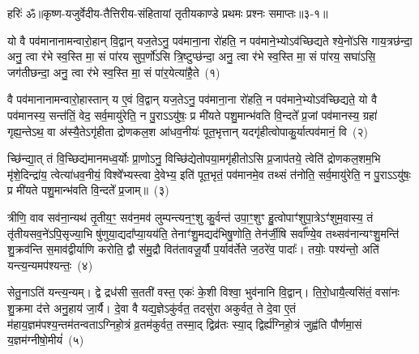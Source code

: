{\anuvakamend[{वी॒र इषꣳ॑ ह॒व्यमु॒षसो॑ मरुतश्च॒ वृष्टिं॒ भग॑स्य॒ द्वाद॑श च}]}%

{हरिः॑ ॐ}{॥कृष्ण-यजुर्वेदीय-तैत्तिरीय-संहितायां तृतीयकाण्डे प्रथमः प्रश्नः समाप्तः॥३-१॥}

\setcounter{anuvakam}{0}
यो वै पव॑मानानामन्वारो॒हान् वि॒द्वान् यज॒ते\-ऽनु॒ पव॑माना॒ना रो॑हति॒ न पव॑माने॒भ्यो\-ऽव॑च्छिद्यते श्ये॒नो॑\-ऽसि गाय॒त्रछ॑न्दा॒ अनु॒ त्वा र॑भे स्व॒स्ति मा॒ सं पा॑रय सुप॒र्णो॑\-ऽसि त्रि॒ष्टुप्छ॑न्दा॒ अनु॒ त्वा र॑भे स्व॒स्ति मा॒ सं पा॑रय॒ सघा॑ऽसि॒ जग॑तीछन्दा॒ अनु॒ त्वा र॑भे स्व॒स्ति मा॒ सं पा॑र॒येत्या॑है॒ते~(१)

वै पव॑मानानामन्वारो॒हास्तान् य ए॒वं वि॒द्वान् यज॒ते\-ऽनु॒ पव॑माना॒ना रो॑हति॒ न पव॑माने॒भ्यो\-ऽव॑च्छिद्यते॒ यो वै पव॑मानस्य॒ सन्त॑तिं॒ वेद॒ सर्व॒मायु॑रेति॒ न पु॒रा\-ऽऽ\-यु॑षः॒ प्र मी॑यते पशु॒मान्भ॑वति वि॒न्दते᳚ प्र॒जां पव॑मानस्य॒ ग्रहा॑ गृह्य॒न्ते\-ऽथ॒ वा अ॑स्यै॒ते\-ऽगृ॑हीता द्रोणकल॒श आ॑धव॒नीयः॑ पूत॒भृत्तान् यदगृ॑हीत्वोपाकु॒र्यात्पव॑मानं॒ वि~(२)

च्छि॑न्द्या॒त् तं वि॒च्छिद्य॑मानमध्व॒र्योः प्रा॒णो\-ऽनु॒ विच्छि॑द्येतोप\-या॒मगृ॑हीतो\-ऽसि प्र॒जा\-प॑तये॒ त्वेति॑ द्रोणकल॒शम॒भि मृ॑शे॒दिन्द्रा॑य॒ त्वेत्या॑धव॒नीयं॒ विश्वे᳚भ्यस्त्वा दे॒वेभ्य॒ इति॑ पूत॒भृतं॒ पव॑मानमे॒व तथ्सं त॑नोति॒ सर्व॒मायु॑रेति॒ न पु॒रा\-ऽऽ\-यु॑षः॒ प्र मी॑यते पशु॒मान्भ॑वति वि॒न्दते᳚ प्र॒जाम्॥~(३)

{\anuvakamend[{ए॒ते वि द्विच॑त्वारिꣳशच्च}]}%

त्रीणि॒ वाव सव॑ना॒न्यथ॑ तृ॒तीय॒ꣳ॒ सव॑न॒मव॑ लुम्पन्त्यन॒ꣳ॒शु कु॒र्वन्त॑ उपा॒ꣳ॒शुꣳ हु॒त्वोपाꣳ॑शुपा॒त्रे\-ऽꣳ॑शुम॒वास्य॒ तं तृ॑तीयसव॒ने॑\-ऽपि॒सृज्या॒भि षु॑णुया॒द्यदा᳚प्या॒यय॑ति॒ तेनाꣳ॑शु॒मद्यद॑भिषु॒णोति॒ तेन॑र्जी॒षि सर्वा᳚ण्ये॒व तथ्सव॑नान्यꣳशु॒मन्ति॑ शु॒क्रव॑न्ति स॒माव॑द्वीर्याणि करोति॒ द्वौ स॑मु॒द्रौ वित॑तावजू॒र्यौ प॒र्याव॑र्तेते ज॒ठरे॑व॒ पादाः᳚। तयोः॒ पश्य॑न्तो॒ अति॑ यन्त्य॒न्यमप॑श्यन्तः॒~(४)

सेतु॒ना\-ऽति॑ यन्त्य॒न्यम्। द्वे द्रध॑सी स॒तती॑ वस्त॒ एकः॑ के॒शी विश्वा॒ भुव॑नानि वि॒द्वान्। ति॒रो॒धायै॒त्यसि॑तं॒ वसा॑नः शु॒क्रमा द॑त्ते अनु॒हाय॑ जा॒र्यै। दे॒वा वै यद्य॒ज्ञे\-ऽकु॑र्वत॒ तदसु॑रा अकुर्वत॒ ते दे॒वा ए॒तं म॑हाय॒ज्ञम॑पश्य॒न्तम॑तन्वता\-ऽ\-ग्निहो॒त्रं व्र॒तम॑कुर्वत॒ तस्मा॒द् द्विव्र॑तः स्या॒द् द्विर्\mbox{}ह्य॑ग्निहो॒त्रं जुह्व॑ति पौर्णमा॒सं य॒ज्ञम॑ग्नीषो॒मीयं॑~(५)

